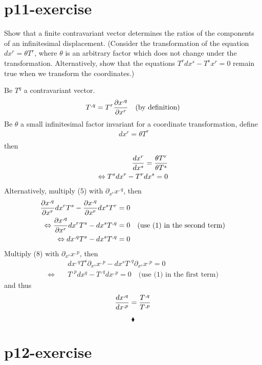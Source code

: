 \section{p11-exercise}

\begin{tcolorbox}
Show that a finite contravariant vector determines the ratios of the components of an infinitesimal displacement. (Consider the transformation of the equation $dx^r=\theta T^r$, where $\theta$ is an arbitrary factor which does not change under the transformation. Alternatively, show that the equations $T^{r} dx^{s}-T^{s} x^{r} = 0$ remain true when we transform the coordinates.)

\end{tcolorbox}
Be $T^{q}$ a contravariant vector.
\begin{align}
T^{,q}=T^{r} \pdv{x^{,q}}{x^r}\quad\text{(by definition)}
\end{align}
Be  $\theta$ a small infinitesimal factor invariant for a coordinate transformation,  define \\
\begin{align}
\ dx^{r} = \theta T^{r} \\
\end{align}
then
\begin{align}
\dv{x^r}{x^s} = \frac{\theta T^r}{\theta T^s}\\
\Leftrightarrow T^s dx^r - T^r dx^s = 0
\end{align}
Alternatively, multiply (5) with $\partial_{x^r}{x^{,q}}$, then
\begin{align}
\pdv{x^{,q}}{x^r} dx^r T^s   -  \pdv{x^{,q}}{x^r}dx^s T^r &= 0\\
\Leftrightarrow \pdv{x^{,q}}{x^r} dx^r T^s   -  dx^s T^{,q} &= 0 \quad \text{(use (1) in the second term)}\\
\Leftrightarrow dx^{,q} T^s   -  dx^s T^{,q} &= 0 \\
\end{align}
Multiply (8) with $\partial_{x^s}{x^{,p}}$, then
\begin{align}
\ &dx^{,q} T^s \partial_{x^s}{x^{,p}}  -  dx^s T^{,q}\partial_{x^s}{x^{,p}} = 0 \\
\Leftrightarrow \quad &T^{,p} dx^q   -   T^{,q} dx^{,p} = 0 \quad \text{(use (1) in the first term)}
\end{align}
and thus 
$$\dv{x^{,q}}{x^{,p}} = \frac{T^{,q}}{T^{,p}}$$

$$\blacklozenge$$
\pagebreak[4]


\section{p12-exercise}

